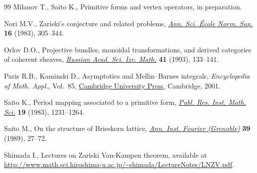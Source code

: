 \documentclass[10pt,a4paper]{article}
\numberwithin{equation}{section}
\providecommand{\LastPageEnding}{}
\begin{document}
\begin{thebibliography}{99}
Milanov T., Saito K., Primitive forms and vertex operators, {i}n preparation.

Nori M.V., Zariski's conjecture and related problems, \href{https://doi.org/10.24033/asens.1450}{\textit{Ann. Sci. \'Ecole
 Norm. Sup.}} \textbf{16} (1983), 305--344.

Orlov D.O., Projective bundles, monoidal transformations, and derived
 categories of coherent sheaves, \href{https://doi.org/10.1070/IM1993v041n01ABEH002182}{\textit{Russian Acad. Sci. Izv. Math.}}
 \textbf{41} (1993), 133--141.

Paris R.B., Kaminski D., Asymptotics and {M}ellin--{B}arnes integrals,
 \textit{Encyclopedia of Math. Appl.}, Vol.~85, \href{https://doi.org/10.1017/CBO9780511546662}{Cambridge University Press},
 Cambridge, 2001.

Saito K., Period mapping associated to a primitive form, \href{https://doi.org/10.2977/prims/1195182028}{\textit{Publ. Res.
 Inst. Math. Sci.}} \textbf{19} (1983), 1231--1264.

Saito M., On the structure of {B}rieskorn lattice, \href{https://doi.org/10.5802/aif.1157}{\textit{Ann. Inst. Fourier
 (Grenoble)}} \textbf{39} (1989), 27--72.

Shimada I., Lectures on {Z}ariski {V}an-{K}ampen theorem, available at
 \url{http://www.math.sci.hiroshima-u.ac.jp/~shimada/LectureNotes/LNZV.pdf}.

\end{thebibliography}\LastPageEnding
\end{document}
